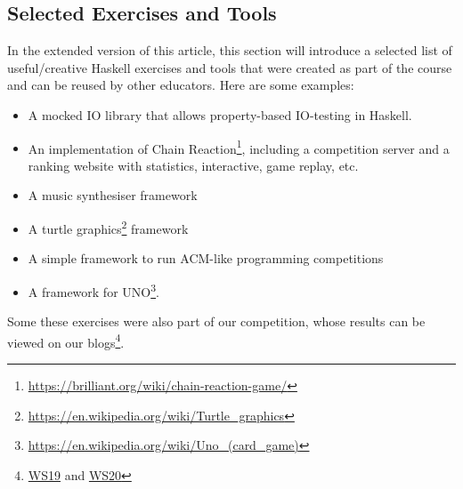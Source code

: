 \subsection{Selected Exercises and Tools}\label{sec:selected_exercises}

In the extended version of this article,
this section will introduce a selected list of
useful/creative Haskell exercises and tools
that were created as part of
the course and can be reused by other educators.
Here are some examples:
\begin{itemize}
\item A mocked IO library that allows property-based IO-testing in Haskell.
\item An implementation of Chain Reaction\footnote{\url{ https://brilliant.org/wiki/chain-reaction-game/}},
including a competition server
and a ranking website with statistics,
interactive, game replay, etc.
\item A music synthesiser framework
\item A turtle graphics\footnote{\url{https://en.wikipedia.org/wiki/Turtle_graphics}} framework
\item A simple framework to run ACM-like programming competitions
\item A framework for UNO\footnote{\url{https://en.wikipedia.org/wiki/Uno_(card_game)}}.
\end{itemize}
Some these exercises were also part of our competition,
whose results can be viewed on our blogs\footnote{\href{https://www21.in.tum.de/teaching/fpv/WS19/wettbewerb.html}{WS19} and \href{https://www21.in.tum.de/teaching/fpv/WS20/wettbewerb.html}{WS20}}.



